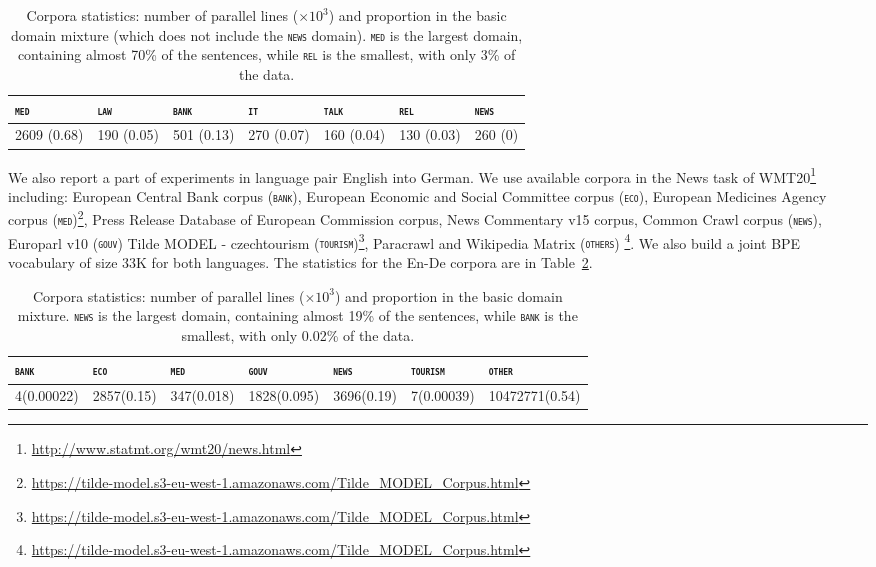 \documentclass[11pt,a4paper]{article}
\newcommand{\domain}[1]{\texttt{\textsc{#1}}}
\begin{document}
\begin{table}[htbp]
  \centering
  \begin{tabular}{ |lllllll|} %
    \hline
    \domain{med} & \domain{law} & \domain{bank} & \domain{it} & \domain{talk} & \domain{rel} & \domain{news} \\
    \hline
    2609 (0.68) & 190 (0.05)  & 501 (0.13) & 270 (0.07) & 160 (0.04) & 130 (0.03) & 260 (0) \\
    \hline
  \end{tabular}
\caption{Corpora statistics: number of parallel lines ($\times 10^3$) and proportion in the basic domain mixture (which does not include the \domain{news} domain). \domain{med} is the largest domain, containing almost 70\% of the sentences, while \domain{rel} is the smallest, with only 3\% of the data.}
\label{tab:Corpora-en-fr}
\end{table}

We also report a part of experiments in language pair English into German. We use available corpora in the News task of WMT20\footnote{\url{http://www.statmt.org/wmt20/news.html}} including: European Central Bank corpus (\domain{bank}),  European Economic and Social Committee corpus (\domain{eco}), European Medicines Agency corpus (\domain{med})\footnote{\url{https://tilde-model.s3-eu-west-1.amazonaws.com/Tilde_MODEL_Corpus.html}}, Press Release Database of European Commission corpus, News Commentary v15 corpus, Common Crawl corpus (\domain{news}), Europarl v10 (\domain{gouv}) Tilde MODEL - czechtourism (\domain{tourism})\footnote{\url{https://tilde-model.s3-eu-west-1.amazonaws.com/Tilde_MODEL_Corpus.html}}, Paracrawl and Wikipedia Matrix (\domain{others}) \footnote{\url{https://tilde-model.s3-eu-west-1.amazonaws.com/Tilde_MODEL_Corpus.html}}. We also build a joint BPE vocabulary of size 33K for both languages. The statistics for the En-De corpora are in Table~\ref{tab:Corpora-en-de}.

\begin{table}[htbp]
  \centering
  \begin{tabular}{ |lllllll|} %
    \hline
    \domain{bank} & \domain{eco} & \domain{med} & \domain{gouv} & \domain{news} & \domain{tourism} & \domain{other} \\
    \hline
    4(0.00022) & 2857(0.15) & 347(0.018) & 1828(0.095) & 3696(0.19) & 7(0.00039) & 10472771(0.54) \\
    \hline
  \end{tabular}
\caption{Corpora statistics: number of parallel lines ($\times 10^3$) and proportion in the basic domain mixture. \domain{news} is the largest domain, containing almost 19\% of the sentences, while \domain{bank} is the smallest, with only 0.02\% of the data.}
\label{tab:Corpora-en-de}
\end{table}
\end{document}
